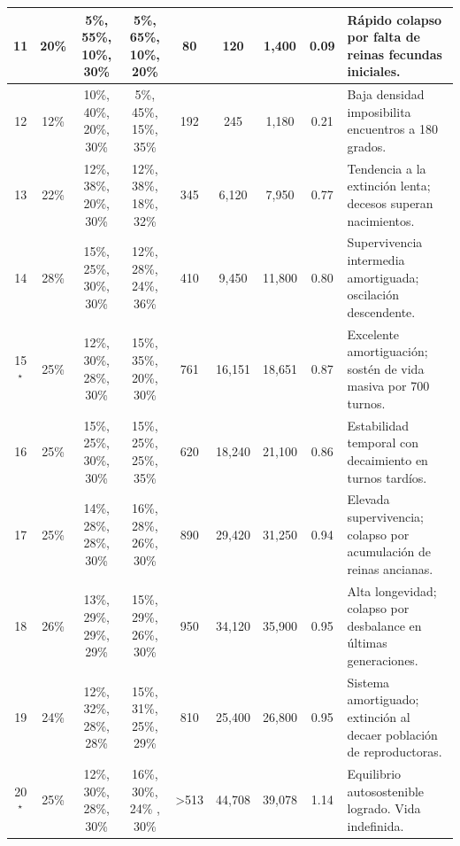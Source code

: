 \documentclass[12pt,a4paper]{article}
\begin{document}
\begin{table}[H]
{\begin{tabular}{|c|c|c|c|c|c|c|c|m{6cm}|}
        11 & 20\% & 5\%, 55\%, 10\%, 30\% & 5\%, 65\%, 10\%, 20\% & 80 & 120 & 1,400 & 0.09 & Rápido colapso por falta de reinas fecundas iniciales. \\ \hline
        12 & 12\% & 10\%, 40\%, 20\%, 30\% & 5\%, 45\%, 15\%, 35\% & 192 & 245 & 1,180 & 0.21 & Baja densidad imposibilita encuentros a 180 grados. \\ \hline
        13 & 22\% & 12\%, 38\%, 20\%, 30\% & 12\%, 38\%, 18\%, 32\% & 345 & 6,120 & 7,950 & 0.77 & Tendencia a la extinción lenta; decesos superan nacimientos. \\ \hline
        14 & 28\% & 15\%, 25\%, 30\%, 30\% & 12\%, 28\%, 24\%, 36\% & 410 & 9,450 & 11,800 & 0.80 & Supervivencia intermedia amortiguada; oscilación descendente. \\ \hline
        15$^\star$ & 25\% & 12\%, 30\%, 28\%, 30\% & 15\%, 35\%, 20\%, 30\% & 761 & 16,151 & 18,651 & 0.87 & Excelente amortiguación; sostén de vida masiva por 700 turnos. \\ \hline
        16 & 25\% & 15\%, 25\%, 30\%, 30\% & 15\%, 25\%, 25\%, 35\% & 620 & 18,240 & 21,100 & 0.86 & Estabilidad temporal con decaimiento en turnos tardíos. \\ \hline
        17 & 25\% & 14\%, 28\%, 28\%, 30\% & 16\%, 28\%, 26\%, 30\% & 890 & 29,420 & 31,250 & 0.94 & Elevada supervivencia; colapso por acumulación de reinas ancianas. \\ \hline
        18 & 26\% & 13\%, 29\%, 29\%, 29\% & 15\%, 29\%, 26\%, 30\% & 950 & 34,120 & 35,900 & 0.95 & Alta longevidad; colapso por desbalance en últimas generaciones. \\ \hline
        19 & 24\% & 12\%, 32\%, 28\%, 28\% & 15\%, 31\%, 25\%, 29\% & 810 & 25,400 & 26,800 & 0.95 & Sistema amortiguado; extinción al decaer población de reproductoras. \\ \hline
        20$^\star$ & 25\% & 12\%, 30\%, 28\%, 30\% & 16\%, 30\%, 24\% , 30\% & >513 & 44,708 & 39,078 & 1.14 & Equilibrio autosostenible logrado. Vida indefinida. \\ \hline
    \end{tabular}
    }
\end{table}
\end{document}
